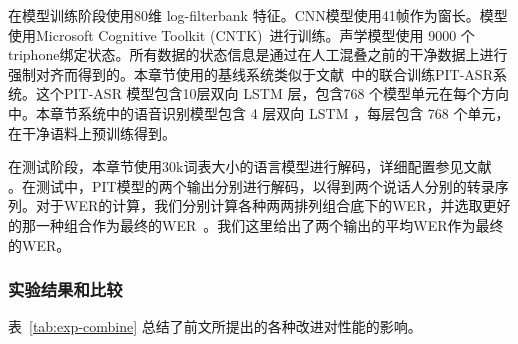 在模型训练阶段使用80维 log-filterbank 特征。CNN模型使用41帧作为窗长。模型使用Microsoft Cognitive Toolkit (CNTK)~\cite{seide2016cntk}进行训练。声学模型使用 9000 个triphone绑定状态。所有数据的状态信息是通过在人工混叠之前的干净数据上进行强制对齐而得到的。本章节使用的基线系统类似于文献~\cite{yu2017recognizing}中的联合训练PIT-ASR系统。这个PIT-ASR 模型包含10层双向 LSTM 层，包含768 个模型单元在每个方向中。本章节系统中的语音识别模型包含 4 层双向 LSTM ，每层包含 768 个单元，在干净语料上预训练得到。

在测试阶段，本章节使用30k词表大小的语言模型进行解码，详细配置参见文献~\cite{chen2018progressive} 。在测试中，PIT模型的两个输出分别进行解码，以得到两个说话人分别的转录序列。对于WER的计算，我们分别计算各种两两排列组合底下的WER，并选取更好的那一种组合作为最终的WER~\cite{yu2017recognizing}。我们这里给出了两个输出的平均WER作为最终的WER。

\subsubsection{实验结果和比较}
\label{Sec:exp-pit-result}

表~\ref{tab:exp-combine} 总结了前文所提出的各种改进对性能的影响。

